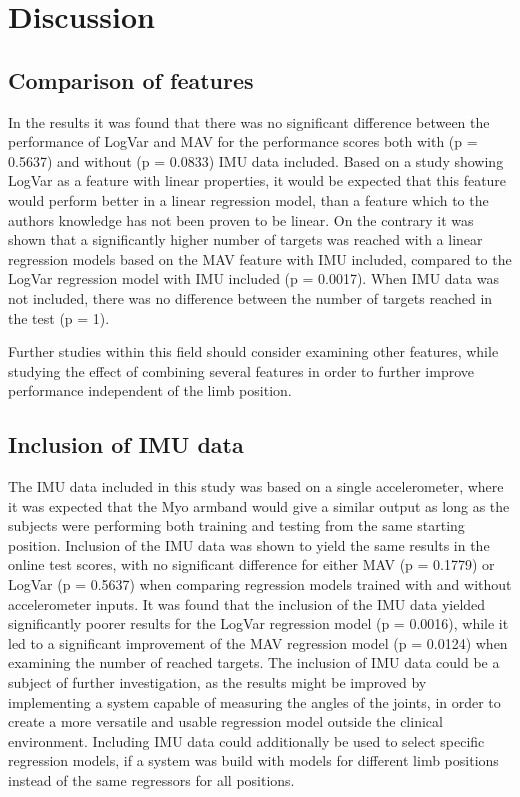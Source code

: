 \section{Discussion}

\subsection{Comparison of features}
In the results it was found that there was no significant difference between the performance of LogVar and MAV for the performance scores both with (p = 0.5637) and without (p = 0.0833) IMU data included. Based on a study \cite{hahne2014} showing LogVar as a feature with linear properties, it would be expected that this feature would perform better in a linear regression model, than a feature which to the authors knowledge has not been proven to be linear. On the contrary it was shown that a significantly higher number of targets was reached with a linear regression models based on the MAV feature with IMU included, compared to the LogVar regression model with IMU included (p = 0.0017). When IMU data was not included, there was no difference between the number of targets reached in the test (p = 1).

Further studies within this field should consider examining other features, while studying the effect of combining several features in order to further improve performance independent of the limb position.

\subsection{Inclusion of IMU data}
The IMU data included in this study was based on a single accelerometer, where it was expected that the Myo armband would give a similar output as long as the subjects were performing both training and testing from the same starting position. Inclusion of the IMU data was shown to yield the same results in the online test scores, with no significant difference for either MAV (p = 0.1779) or LogVar (p = 0.5637) when comparing regression models trained with and without accelerometer inputs. It was found that the inclusion of the IMU data yielded significantly poorer results for the LogVar regression model (p = 0.0016), while it led to a significant improvement of the MAV regression model (p = 0.0124) when examining the number of reached targets. The inclusion of IMU data could be a subject of further investigation, as the results might be improved by implementing a system capable of measuring the angles of the joints, in order to create a more versatile and usable regression model outside the clinical environment. Including IMU data could additionally be used to select specific regression models, if a system was build with models for different limb positions instead of the same regressors for all positions.

